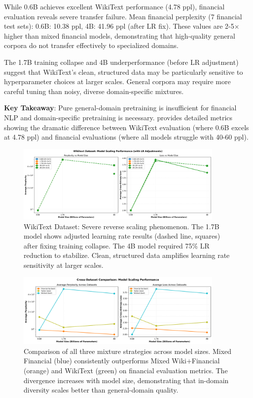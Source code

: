 While 0.6B achieves excellent WikiText performance (4.78 ppl), financial evaluation reveals severe transfer failure. Mean financial perplexity (7 financial test sets): 0.6B: 10.38 ppl, 4B: 41.96 ppl (after LR fix). These values are 2-5$\times$ higher than mixed financial models, demonstrating that high-quality general corpora do not transfer effectively to specialized domains.

The 1.7B training collapse and 4B underperformance (before LR adjustment) suggest that WikiText's clean, structured data may be particularly sensitive to hyperparameter choices at larger scales. General corpora may require more careful tuning than noisy, diverse domain-specific mixtures.

\textbf{Key Takeaway}: Pure general-domain pretraining is insufficient for financial NLP and domain-specific pretraining is necessary.  provides detailed metrics showing the dramatic difference between WikiText evaluation (where 0.6B excels at 4.78 ppl) and financial evaluations (where all models struggle with 40-60 ppl).

\begin{figure}[htbp]
\centering
\includegraphics[width=0.9\textwidth]{figures/scaling_wikitext.png}
\caption[WikiText Dataset: Reverse Scaling]{WikiText Dataset: Severe reverse scaling phenomenon. The 1.7B model shows adjusted learning rate results (dashed line, squares) after fixing training collapse. The 4B model required 75\% LR reduction to stabilize. Clean, structured data amplifies learning rate sensitivity at larger scales.}
\label{fig:scaling_wikitext}
\end{figure}



\begin{figure}[htbp]
\centering
\includegraphics[width=0.9\textwidth]{figures/scaling_comparison_all.png}
\caption[Comparison of Mixture Strategies]{Comparison of all three mixture strategies across model sizes. Mixed Financial (blue) consistently outperforms Mixed Wiki+Financial (orange) and WikiText (green) on financial evaluation metrics. The divergence increases with model size, demonstrating that in-domain diversity scales better than general-domain quality.}
\label{fig:scaling_comparison_all}
\end{figure}

